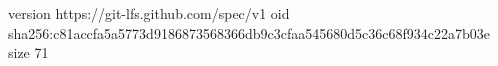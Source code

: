 version https://git-lfs.github.com/spec/v1
oid sha256:c81accfa5a5773d9186873568366db9c3cfaa545680d5c36c68f934c22a7b03e
size 71
